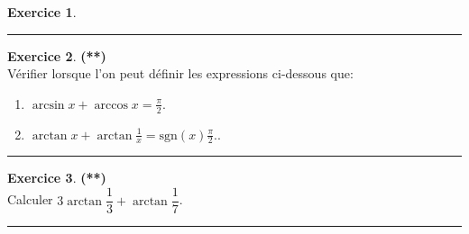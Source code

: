\documentclass[a4paper,11pt]{article}
\theoremstyle{definition}
\newtheorem{exo}{Exercice} %
\begin{document}
\begin{minipage}{1\linewidth}
\begin{minipage}[t]{0.48\linewidth}
\begin{exo}
			
			\centering
			\rule{1\linewidth}{0.6pt}
		\end{exo}
		
		\begin{exo}\textbf{(**)}\quad\\[0.2cm]
			Vérifier lorsque l'on peut définir les expressions ci-dessous que:
			\begin{enumerate}
				\item $ \arcsin x + \arccos x = \frac{\pi}{2}$.
				\item $\arctan x + \arctan\frac{1}{x} = \text{sgn}(x)\frac{\pi}{2}.$.
			\end{enumerate}
			
			\centering
			\rule{1\linewidth}{0.6pt}
		\end{exo}
		
	
		
		\begin{exo}\textbf{(**)}\quad\\[0.2cm]
			
	Calculer $3 \arctan \dfrac{1}{3} + \arctan \dfrac{1}{7} $.
			
			\centering
			\rule{1\linewidth}{0.6pt}
		\end{exo}
		
		
		
	\end{minipage}
\end{minipage}
\end{document}
